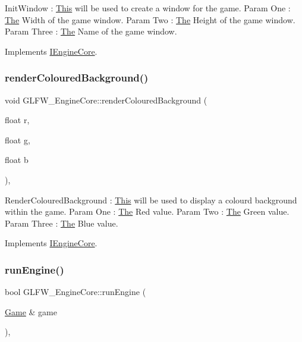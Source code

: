 Init\+Window \+: \mbox{\hyperlink{class_this}{This}} will be used to create a window for the game. Param One \+: \mbox{\hyperlink{class_the}{The}} Width of the game window. Param Two \+: \mbox{\hyperlink{class_the}{The}} Height of the game window. Param Three \+: \mbox{\hyperlink{class_the}{The}} Name of the game window. 

Implements \mbox{\hyperlink{class_i_engine_core_a27123704f8f24eefd9cb47aa9986cbf3}{I\+Engine\+Core}}.

\mbox{\label{class_g_l_f_w___engine_core_a6031a54b0978d6e0fd1be3f292c2059f}} 
\subsubsection{\texorpdfstring{render\+Coloured\+Background()}{renderColouredBackground()}}
{\footnotesize\ttfamily void G\+L\+F\+W\+\_\+\+Engine\+Core\+::render\+Coloured\+Background (\begin{DoxyParamCaption}\item[{float}]{r,  }\item[{float}]{g,  }\item[{float}]{b }\end{DoxyParamCaption})\hspace{0.3cm}{\ttfamily [override]}, {\ttfamily [virtual]}}

Render\+Coloured\+Background \+: \mbox{\hyperlink{class_this}{This}} will be used to display a colourd background within the game. Param One \+: \mbox{\hyperlink{class_the}{The}} Red value. Param Two \+: \mbox{\hyperlink{class_the}{The}} Green value. Param Three \+: \mbox{\hyperlink{class_the}{The}} Blue value. 

Implements \mbox{\hyperlink{class_i_engine_core_a8f8e0778f04c50b680cdde167cb38e2f}{I\+Engine\+Core}}.

\mbox{\label{class_g_l_f_w___engine_core_adf9266f1a9b5d97992691224f0f20c7b}} 
\subsubsection{\texorpdfstring{run\+Engine()}{runEngine()}}
{\footnotesize\ttfamily bool G\+L\+F\+W\+\_\+\+Engine\+Core\+::run\+Engine (\begin{DoxyParamCaption}\item[{\mbox{\hyperlink{class_game}{Game}} \&}]{game }\end{DoxyParamCaption})\hspace{0.3cm}{\ttfamily [override]}, {\ttfamily [virtual]}}

